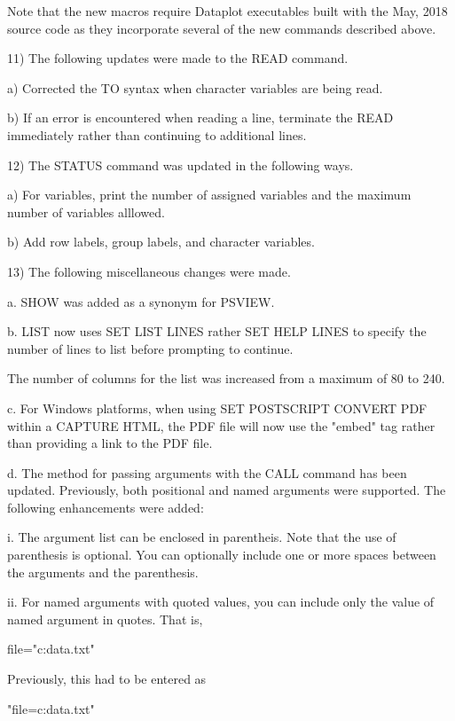     Note that the new macros require Dataplot executables built with the
    May, 2018 source code as they incorporate several of the new
    commands described above.

11) The following updates were made to the READ command.

    a) Corrected the TO syntax when character variables are being
       read.

    b) If an error is encountered when reading a line, terminate the
       READ immediately rather than continuing to additional lines.

12) The STATUS command was updated in the following ways.

    a) For variables, print the number of assigned variables and the
       maximum number of variables alllowed.

    b) Add row labels, group labels, and character variables.

13) The following miscellaneous changes were made.

    a. SHOW was added as a synonym for PSVIEW.

    b. LIST now uses SET LIST LINES rather SET HELP LINES to specify the
       number of lines to list before prompting to continue.

       The number of columns for the list was increased from a maximum of
       80 to 240.

    c. For Windows platforms, when using SET POSTSCRIPT CONVERT PDF
       within a CAPTURE HTML, the PDF file will now use the "embed"
       tag rather than providing a link to the PDF file.

    d. The method for passing arguments with the CALL command has been
       updated.  Previously, both positional and named arguments were
       supported.  The following enhancements were added:

           i. The argument list can be enclosed in parentheis.  Note that
              the use of parenthesis is optional.  You can optionally
              include one or more spaces between the arguments and the
              parenthesis.

          ii. For named arguments with quoted values, you can include
              only the value of named argument in quotes.  That is,

                  file="c:\my data\test.txt"

              Previously, this had to be entered as

                  "file=c:\my data\test.txt"


